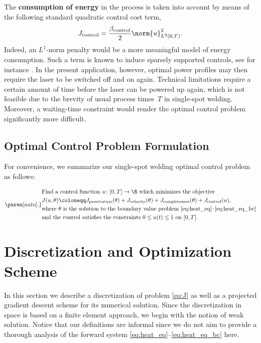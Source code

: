 The \textbf{consumption of energy} in the process is taken into account by means of the following standard quadratic control cost term,
\begin{equation}
	J_{\text{control}} 
	=
	\frac{\beta_\text{control}}{2} \norm{u}^2_{L^2(0,T)}
	.
\end{equation}
Indeed, an $L^1$-norm penalty would be a more meaningful model of energy consumption.
Such a term is known to induce sparsely supported controls, see for instance \cite{VossenMaurer:2006:1,Stadler:2009:1,CasasHerzogWachsmuth:2012:2}.
In the present application, however, optimal power profiles may then require the laser to be switched off and on again.
Technical limitations require a certain amount of time before the laser can be powered up again, which is not feasible due to the brevity of usual process times~$T$ in single-spot welding.
Moreover, a waiting-time constraint would render the optimal control problem significantly more difficult.


\subsection{Optimal Control Problem Formulation}

For convenience, we summarize our single-spot welding optimal control problem as follows:

\begin{equation} \label{eq:J}
	\paren[auto].\}{%
		\begin{aligned}
			&
			\text{Find a control function $u \colon [0,T] \to \R$ which minimizes the objective}
			\\
			&
			J(u,\theta) 
			\coloneqq 
			J_{\text{penetration}}(\theta) + J_{\text{velocity}}(\theta) + J_{\text{completeness}}(\theta) + J_{\text{control}}(u)
			,
			\\
			&
			\text{where $\theta$ is the solution to the boundary value problem \eqref{eq:heat_eq}--\eqref{eq:heat_eq_bc}}
			\\
			&
			\text{and the control satisfies the constraints $0 \le u(t) \le 1$ on $[0,T]$}
			.
		\end{aligned}
	}
\end{equation}


\section{Discretization and Optimization Scheme}
\label{sec:discretization}

In this section we describe a discretization of problem \eqref{eq:J} as well as a projected gradient descent scheme for its numerical solution.
Since the discretization in space is based on a finite element approach, we begin with the notion of weak solution.
Notice that our definitions are informal since we do not aim to provide a thorough analysis of the forward system \eqref{eq:heat_eq}--\eqref{eq:heat_eq_bc} here.


